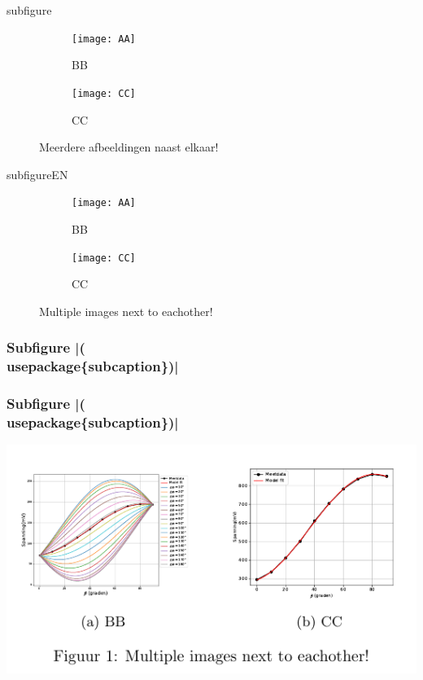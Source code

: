 \begin{saveblock}{subfigure}
	\begin{highlightblock}[linewidth=0.95\textwidth,framexleftmargin=0.25em]
		\begin{figure}[htbp]
			\centering
			\begin{subfigure}[b]{0.45\textwidth}
				\texttt{[image: AA]}
				\caption{BB}
				\label{fig:dphiExample}
			\end{subfigure}\qquad
			\begin{subfigure}[b]{0.45\textwidth}
				\texttt{[image: CC]}
				\caption{CC}
				\label{fig:fitExample}
			\end{subfigure}
			\caption{Meerdere afbeeldingen naast elkaar!}
		\end{figure}
	\end{highlightblock}
\end{saveblock}

\begin{saveblock}{subfigureEN}
	\begin{highlightblock}[linewidth=0.95\textwidth,framexleftmargin=0.25em]
		\begin{figure}[htbp]
			\centering
			\begin{subfigure}[b]{0.45\textwidth}
				\texttt{[image: AA]}
				\caption{BB}
				\label{fig:dphiExample}
			\end{subfigure}\qquad
			\begin{subfigure}[b]{0.45\textwidth}
				\texttt{[image: CC]}
				\caption{CC}
				\label{fig:fitExample}
			\end{subfigure}
			\caption{Multiple images next to eachother!}
		\end{figure}
	\end{highlightblock}
\end{saveblock}


\begin{frame}
	\frametitle{Subfigure \hll|(\\usepackage\{subcaption\})|}

\end{frame}

\begin{frame}
	\frametitle{Subfigure \hll|(\\usepackage\{subcaption\})|}

	\centering
	\includegraphics[width=\textwidth,height=0.8\textheight,keepaspectratio]{assets/4_Abeeldingen/outdir/subfigure}
\end{frame}
